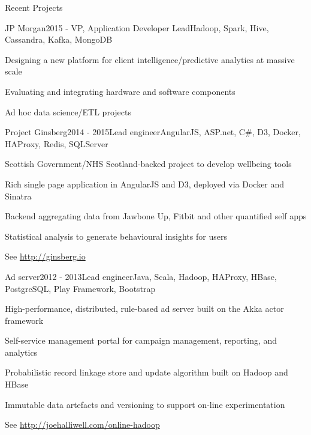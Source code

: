 \documentclass{resume} %
\begin{document}
\begin{rSection}{Recent Projects}

\begin{rSubsection}{JP Morgan}{2015 - }{VP, Application Developer Lead}{Hadoop, Spark, Hive, Cassandra, Kafka, MongoDB}
\item Designing a new platform for client intelligence/predictive analytics at massive scale
\item Evaluating and integrating hardware and software components
\item Ad hoc data science/ETL projects
\end{rSubsection}

\begin{rSubsection}{Project Ginsberg}{2014 - 2015}{Lead engineer}{AngularJS, ASP.net, C\#, D3, Docker, HAProxy, Redis, SQLServer}
\item Scottish Government/NHS Scotland-backed project to develop wellbeing tools
\item Rich single page application in AngularJS and D3, deployed via Docker and Sinatra
\item Backend aggregating data from Jawbone Up, Fitbit and other quantified self apps
\item Statistical analysis to generate behavioural insights for users
\item See \url{http://ginsberg.io}
\end{rSubsection}


\begin{rSubsection}{Ad server}{2012 - 2013}{Lead engineer}{Java, Scala, Hadoop, HAProxy, HBase, PostgreSQL, Play Framework, Bootstrap}
\item High-performance, distributed, rule-based ad server built on the Akka actor framework
\item Self-service management portal for campaign management, reporting, and analytics
\item Probabilistic record linkage store and update algorithm built on Hadoop and HBase
\item Immutable data artefacts and versioning to support on-line experimentation
\item See \url{http://joehalliwell.com/online-hadoop}
\end{rSubsection}


\end{rSection}
\end{document}
